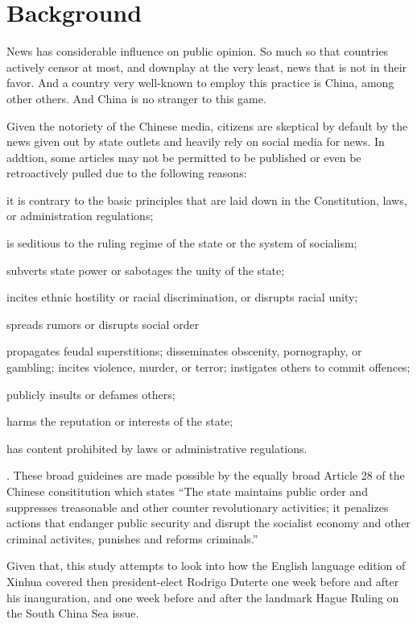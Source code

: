 \section{Background}\label{sec:background}

News has considerable influence on public opinion. So much so that
countries actively censor at most, and downplay at the very least, news
that is not in their favor. And a country very well-known to employ
this practice is China, among other others. And China is no stranger to
this game.

Given the notoriety of the Chinese media, citizens are skeptical by
default by the news given out by state outlets and heavily rely on
social media for news\autocite{xu_watching_2016}. In addtion, some
articles may not be permitted to be published or even be retroactively
pulled due to the following reasons:
\begin{enumerate*}[label={\alph*}.)]
	\item it is contrary to the basic principles that are laid down
	in the Constitution, laws, or administration regulations;
	\item is seditious to the ruling regime of the state or the
	system of socialism;
	\item subverts state power or sabotages the unity of the state;
	\item incites ethnic hostility or racial discrimination, or
	disrupts racial unity;
	\item spreads rumors or disrupts social order
	\item propagates feudal superstitions; disseminates obscenity,
	pornography, or gambling; incites violence, murder, or terror;
	instigates others to commit offences;
	\item publicly insults or defames others;
	\item harms the reputation or interests of the state;
	\item has content prohibited by laws or administrative
	regulations.
\end{enumerate*} \autocite[107]{liang_internet_2010}. These broad
guideines are made possible by the equally broad Article 28 of the
Chinese consititution which states ``The state maintains public order
and suppresses treasonable and other counter revolutionary activities;
it penalizes actions that endanger public security and disrupt the
socialist economy and other criminal activites, punishes and reforms
criminals.''

Given that, this study attempts to look into how the English language
edition of Xinhua covered then president-elect Rodrigo Duterte one week
before and after his inauguration, and one week before and after the
landmark Hague Ruling on the South China Sea issue.


